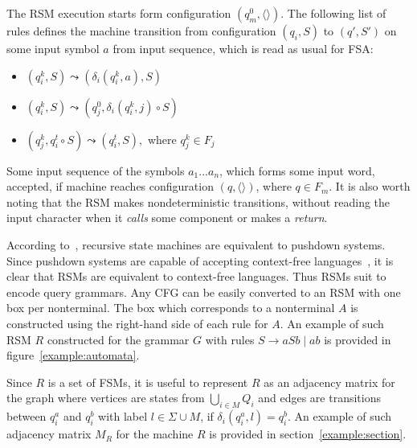 The RSM execution starts form configuration $(q_m^0, \langle\rangle)$. 
The following list of rules defines the machine transition from configuration $(q_i,S)$ to $(q',S')$ on some input symbol $a$ from input sequence, which is read as usual for FSA:

\begin{itemize}
	\item $(q_i^k,S) \leadsto (\delta_i (q_i^k, a),S)$
	\item $(q_i^k,S) \leadsto (q_j^0, \delta_i (q_i^k, j) \circ S)$
	\item $(q_j^k,q_i^t\circ S) \leadsto (q_i^t, S),$ where $q_j^k \in F_j$ 
\end{itemize}

Some input sequence of the symbols $a_1 ... a_n$, which forms some input word, accepted, if machine reaches configuration $(q,\langle\rangle)$, where $q \in F_m$. It is also worth noting that the  RSM makes nondeterministic transitions, without reading the input character when it \textit{calls} some component or  makes a \textit{return}.

According to~\cite{rsm:analysis:10.1007/3-540-44585-4_18}, recursive state machines are equivalent to pushdown systems.
Since pushdown systems are capable of accepting context-free languages~\cite{automata:theory:10.5555/1177300}, it is clear that RSMs are equivalent to context-free languages.
Thus RSMs suit to encode query grammars.
Any CFG can be easily converted to an RSM with one box per nonterminal.
The box which corresponds to a nonterminal $A$ is constructed using the right-hand side of each rule for $A$.
An example of such RSM $R$ constructed for the grammar $G$ with rules $S \to a S b \mid a b$ is provided in figure~\ref{example:automata}.

Since $R$ is a set of FSMs, it is useful to represent $R$ as an adjacency matrix for the graph where vertices are states from $\bigcup_{i \in M}Q_i$ and edges are transitions between $q_i^a$ and $q_i^b$ with label $l \in \Sigma \cup M$, if $\delta_i (q_i^a, l) = q_i^b$.
An example of such adjacency matrix $M_R$ for the machine $R$ is provided in section~\ref{example:section}.

